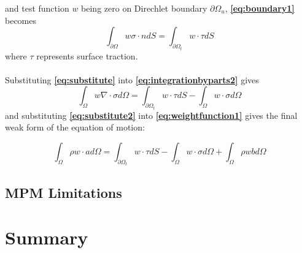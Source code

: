 and test function $w$ being zero on Direchlet boundary $\partial\Omega_u$, {\bfseries \ref{eq:boundary1}} becomes
\begin{equation}
\int_{\partial\Omega} w \sigma \cdot n dS = \int_{\partial\Omega_t} w\cdot\tau  dS
\label{eq:substitute}
\end{equation}
where $\tau$ represents surface traction.\\\\
Substituting {\bfseries \ref{eq:substitute}} into {\bfseries \ref{eq:integrationbyparts2}} gives
\begin{equation}
\int_\Omega w\nabla\cdot\sigma d\Omega= \int_{\partial\Omega_t} w\cdot\tau dS - \int_\Omega w\cdot\sigma d\Omega
\label{eq:substitute2}
\end{equation}
and substituting  {\bfseries \ref{eq:substitute2}} into {\bfseries \ref{eq:weightfunction1}} gives the final weak form of the equation of motion:

\begin{equation}
\int_\Omega \rho w \cdot ad\Omega =  \int_{\partial\Omega_t} w\cdot\tau dS - \int_\Omega w\cdot\sigma d\Omega + \int_\Omega \rho w b d\Omega
\label{eq:weakform}
\end{equation}



\subsection{MPM Limitations}
\section{Summary}
